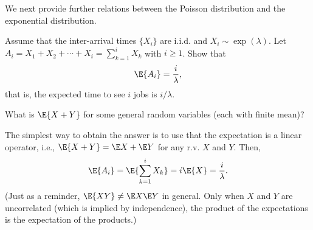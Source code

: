 We next provide further relations between the Poisson distribution and the exponential distribution. 

  \begin{exercise}
    Assume that the inter-arrival times $\{X_i\}$ are i.i.d. and
    $X_i\sim\exp(\lambda)$. Let
    $A_i=X_1+X_2+\cdots+X_i=\sum_{k=1}^i X_k$ with $i\geq 1$. Show that %
 \begin{equation*}
\E{A_i} = \frac i\lambda,
 \end{equation*}
 that is, the expected time to see $i$ jobs is $i/\lambda$.
 \begin{hint} What is $\E{X+Y}$ for some general random variables (each with finite mean)?
 \end{hint}
  \begin{solution}
The simplest way to obtain the answer is to use that the expectation is a linear operator, i.e., $\E{X+Y}= \E X + \E Y$ for any r.v. $X$ and $Y$. Then,
\begin{equation*}
\E{A_i} = \E{\sum_{k=1}^i X_k} = i \E{X} = \frac i \lambda.
\end{equation*}
(Just as a reminder, $\E{X Y} \neq \E X \E Y$ in general. Only when $X$ and $Y$ are uncorrelated (which is implied by independence), the product of the expectations is the expectation of the products.)

  \end{solution}
\end{exercise}

